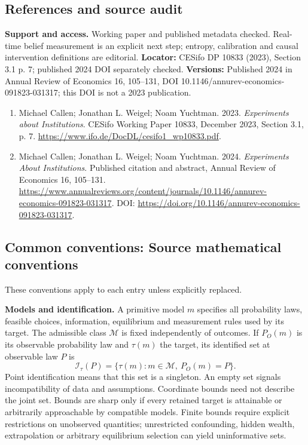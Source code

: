 \documentclass[11pt,a4paper]{article}
\begin{document}
\subsection*{References and source audit}
\textbf{Support and access.} Working paper and published metadata checked. Real-time belief measurement is an explicit next step; entropy, calibration and causal intervention definitions are editorial. \textbf{Locator:} CESifo DP 10833 (2023), Section 3.1 p. 7; published 2024 DOI separately checked. \textbf{Versions:} Published 2024 in Annual Review of Economics 16, 105--131, DOI 10.1146/annurev-economics-091823-031317; this DOI is not a 2023 publication. 
\begin{enumerate}\raggedright
\item\hypertarget{definitions:source:30007662:1}{} Michael Callen; Jonathan L. Weigel; Noam Yuchtman. 2023. \emph{Experiments about Institutions}. CESifo Working Paper 10833, December 2023, Section 3.1, p. 7.
\url{https://www.ifo.de/DocDL/cesifo1_wp10833.pdf}.
\item\hypertarget{definitions:source:30007662:2}{} Michael Callen; Jonathan L. Weigel; Noam Yuchtman. 2024. \emph{Experiments About Institutions}. Published citation and abstract, Annual Review of Economics 16, 105--131.
\url{https://www.annualreviews.org/content/journals/10.1146/annurev-economics-091823-031317}.
DOI: \url{https://doi.org/10.1146/annurev-economics-091823-031317}.
\end{enumerate}

\subsection*{Common conventions: Source mathematical conventions}

These conventions apply to each entry unless explicitly replaced.

\textbf{Models and identification.} A primitive model \(m\) specifies all probability laws, feasible choices, information, equilibrium and measurement rules used by its target. The admissible class \(\mathcal M\) is fixed independently of outcomes. If \(P_O(m)\) is its observable probability law and \(\tau(m)\) the target, its identified set at observable law \(P\) is
\[
 \mathcal I_\tau(P)=\{\tau(m):m\in\mathcal M,\ P_O(m)=P\}.
\]
Point identification means that this set is a singleton. An empty set signals incompatibility of data and assumptions. Coordinate bounds need not describe the joint set. Bounds are sharp only if every retained target is attainable or arbitrarily approachable by compatible models. Finite bounds require explicit restrictions on unobserved quantities; unrestricted confounding, hidden wealth, extrapolation or arbitrary equilibrium selection can yield uninformative sets.
\end{document}
